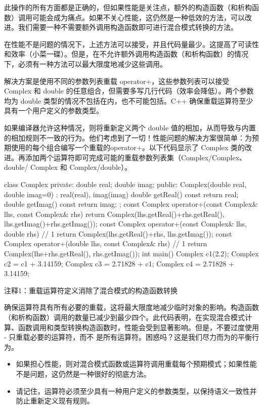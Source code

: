 此操作的所有方面都是正确的，但如果性能是关注点，额外的构造函数（和析构函数）调用可能会成为痛点。如果不关心性能，这仍然是一种低效的方法，可以改进。我们需要一种不需要额外调用构造函数即可进行混合模式转换的方法。


在性能不是问题的情况下，上述方法可以接受，并且代码量最少。这提高了可读性和效率（小菜一碟）。但是，在不允许额外调用构造函数（和析构函数）的情况下，必须有一种方法可以最大限度地减少这些调用。

解决方案是使用不同的参数列表重载 operator+，这些参数列表可以接受 Complex 和 double 的任意组合，但需要多写几行代码（效率会降低）。两个参数均为 double 类型的情况不包括在内，也不可能包括。C++ 确保重载运算符至少具有一个用户定义的参数类型。

如果编译器允许这种情况，则将重新定义两个 double 值的相加，从而导致与内置的相加规则不一致的行为。他们考虑到了一切！性能问题的解决方案很简单：为预期使用的每个组合编写一个重载的operator+。以下代码显示了 Complex 类的改进。再添加两个运算符即可完成可能的重载参数列表集（Complex/Complex、double/ Complex 和 Complex/double）。


\begin{cpp}
class Complex {
private:
  double real;
  double imag;
public:
  Complex(double real, double imag=0) : real(real), imag(imag) {}
  double getReal() const { return real; }
  double getImag() const { return imag; }
};
const Complex operator+(const Complex& lhs, const Complex& rhs) {
  return Complex(lhs.getReal()+rhs.getReal(), lhs.getImag()+rhs.getImag());
}
const Complex operator+(const Complex& lhs, double rhs) { // 1
  return Complex(lhs.getReal()+rhs, lhs.getImag());
}
const Complex operator+(double lhs, const Complex& rhs) { // 1
  return Complex(lhs+rhs.getReal(), rhs.getImag());
}
int main() {
  Complex c1(2.2);
  Complex c2 = c1 + 3.14159;
  Complex c3 = 2.71828 + c1;
  Complex c4 = 2.71828 + 3.14159;
}
\end{cpp}

{\footnotesize
注释1：重载运算符定义消除了混合模式的构造函数转换
}

确保运算符具有所有必要的重载，这将最大限度地减少临时对象的影响。构造函数（和析构函数）调用的数量已减少到最少四个。此代码表明，在实现混合模式计算、函数调用和类型转换构造函数时，性能会受到显著影响。但是，不要过度使用 - 只重载必要的运算符，而不 是所有运算符。困惑吗？这是我们尽力而为的平衡行为。


\begin{itemize}
\item
如果担心性能，则对混合模式函数或运算符调用重载每个预期模式；如果性能不是问题，这仍然是一种很好的彻底方法。

\item
请记住，运算符必须至少具有一种用户定义的参数类型，以保持语义一致性并防止重新定义现有规则。
\end{itemize}
